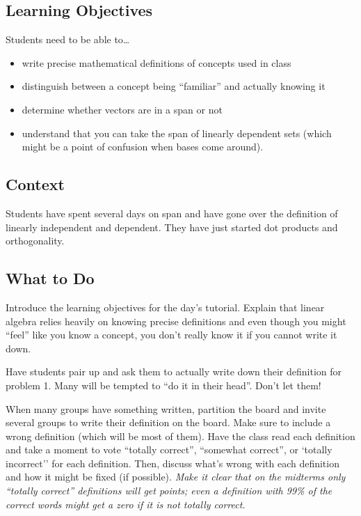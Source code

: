 \subsection*{Learning Objectives}
	Students need to be able to\ldots
	\begin{itemize}
		\item write precise mathematical definitions of concepts used in class
		\item distinguish between a concept being ``familiar'' and actually knowing it
		\item determine whether vectors are in a span or not
		\item understand that you can take the span of linearly dependent sets (which
			might be a point of confusion when bases come around).
	\end{itemize}

\subsection*{Context}
	Students have spent several days on span and have gone over the definition of linearly independent
		and dependent. They have just started dot products and orthogonality.

\subsection*{What to Do}
	Introduce the learning objectives for the day's tutorial. Explain that linear algebra relies
		heavily on knowing precise definitions and even though you might ``feel'' like
		you know a concept, you don't really know it if you cannot write it down.
	
	Have students pair up and ask them to actually write down their definition for problem 1.
	Many will be tempted to ``do it in their head''. Don't let them!

	When many groups have something written, partition the board and invite several groups to
	write their definition on the board. Make sure to include a wrong definition (which will be
	most of them). Have the class read each definition and take a moment to vote
	``totally correct'', ``somewhat correct'', or `totally incorrect'' for each definition.
	Then, discuss what's wrong with each definition and how it might be fixed (if possible).
	\emph{Make it clear that on the midterms only ``totally correct'' definitions will get points;
	even a definition with 99\% of the correct words might get a zero if it is not totally correct.}

